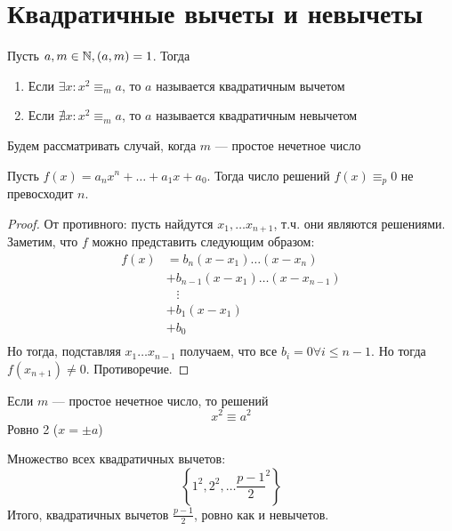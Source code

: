 
\section{Квадратичные вычеты и невычеты}

\begin{definition}
    Пусть \(a, m \in \mathbb{N}, (a, m) = 1\). Тогда 
    \begin{enumerate}
        \item[] Если \(\exists x: x^2 \equiv_m a\), то \(a\) называется квадратичным вычетом
        \item[] Если \(\nexists x: x^2 \equiv_m a\), то \(a\) называется квадратичным невычетом
    \end{enumerate}
\end{definition}

Будем рассматривать случай, когда \(m\) --- простое нечетное число

\begin{theorem}[Лагранжа]
    Пусть \(f(x) = a_nx^n + \dots + a_1x + a_0\). Тогда число решений \(f(x) \equiv_p 0\) не превосходит \(n\).
\end{theorem}
\begin{proof}
    От противного: пусть найдутся \(x_1, \dots x_{n+1}\), т.ч. они являются решениями. Заметим, что \(f\) можно представить следующим образом:
    \[
    \begin{array}{rl}
        f(x) & = b_n(x - x_1)\dots(x-x_{n}) \\
        & + b_{n-1}(x - x_1)\dots(x-x_{n-1}) \\
        & \;\;\;\vdots \\
        & + b_1(x - x_1) \\
        & + b_0 \\

    \end{array}
    \]
    Но тогда, подставляя \(x_1 \dots x_{n-1}\) получаем, что все \(b_i = 0 \forall i \le n - 1\). Но тогда \(f(x_{n+1}) \ne 0\). Противоречие.
\end{proof}

\begin{note}
    Если \(m\) --- простое нечетное число, то решений 
    \[x^2 \equiv a^2\]
    Ровно 2 (\(x = \pm a\))
\end{note}

\begin{note}
    Множество всех квадратичных вычетов:
    \[\left\{1^2, 2^2, \dots \frac{p-1}{2}^2\right\}\]
    Итого, квадратичных вычетов \(\frac{p-1}{2}\), ровно как и невычетов.
\end{note}

